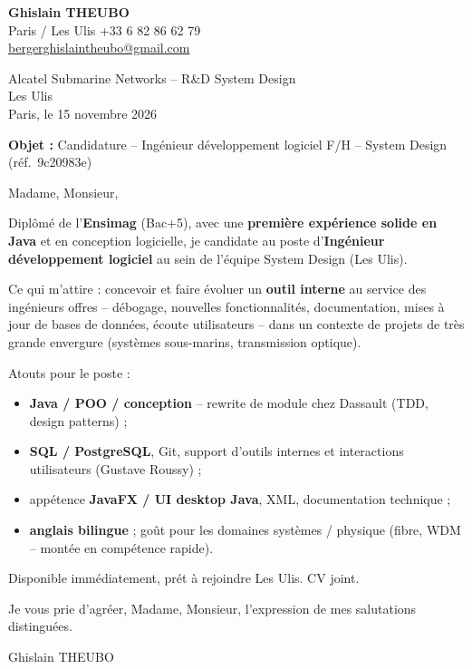 \documentclass[11pt,a4paper]{article}
\begin{document}

\noindent\textbf{Ghislain THEUBO}\\
Paris / Les Ulis \quad +33 6 82 86 62 79\\
\href{mailto:bergerghislaintheubo@gmail.com}{bergerghislaintheubo@gmail.com}

\vspace{0.45em}
\begin{flushright}
Alcatel Submarine Networks -- R\&D System Design\\
Les Ulis\\
Paris, le 15 novembre 2026
\end{flushright}

\vspace{0.3em}
\noindent\textbf{Objet :} Candidature -- Ing\'enieur d\'eveloppement logiciel F/H -- System Design (r\'ef.\ 9c20983e)

\vspace{0.65em}
\noindent Madame, Monsieur,

\vspace{0.35em}
\noindent Dipl\^om\'e de l'\textbf{Ensimag} (Bac+5), avec une \textbf{premi\`ere exp\'erience solide en Java} et en conception logicielle, je candidate au poste d'\textbf{Ing\'enieur d\'eveloppement logiciel} au sein de l'\'equipe System Design (Les Ulis).

\vspace{0.3em}
\noindent Ce qui m'attire : concevoir et faire \'evoluer un \textbf{outil interne} au service des ing\'enieurs offres -- d\'ebogage, nouvelles fonctionnalit\'es, documentation, mises \`a jour de bases de donn\'ees, \'ecoute utilisateurs -- dans un contexte de projets de tr\`es grande envergure (syst\`emes sous-marins, transmission optique).

\vspace{0.25em}
\noindent Atouts pour le poste :
\begin{itemize}\itemsep0.1em
  \item \textbf{Java / POO / conception} -- rewrite de module chez Dassault (TDD, design patterns) ;
  \item \textbf{SQL / PostgreSQL}, Git, support d'outils internes et interactions utilisateurs (Gustave Roussy) ;
  \item app\'etence \textbf{JavaFX / UI desktop Java}, XML, documentation technique ;
  \item \textbf{anglais bilingue} ; go\^ut pour les domaines syst\`emes / physique (fibre, WDM -- mont\'ee en comp\'etence rapide).
\end{itemize}

\noindent Disponible imm\'ediatement, pr\'et \`a rejoindre Les Ulis. CV joint.

\vspace{0.5em}
\noindent Je vous prie d'agr\'eer, Madame, Monsieur, l'expression de mes salutations distingu\'ees.

\vspace{1em}
\noindent Ghislain THEUBO
\end{document}
